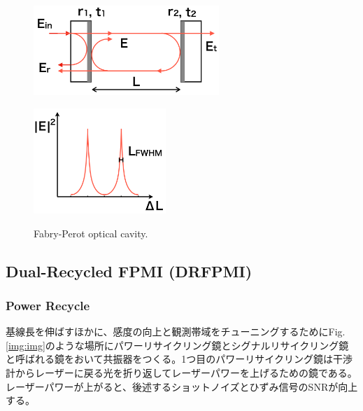 \begin{figure}[h]
  \begin{minipage}[b]{0.5\hsize}
    \begin{center}   
      \includegraphics[width=7cm]{./img_chap1/img133a.png}
       \label{img:img133a}
    \end{center}
  \end{minipage}\hspace{3pt}
  \begin{minipage}[b]{0.5\hsize}
    \begin{center}   
      \includegraphics[width=5cm]{./img_chap1/img133b.png}
       \label{img:img133b}
    \end{center}    
  \end{minipage}
  \caption{Fabry-Perot optical cavity.}
\end{figure}


\subsection{Dual-Recycled FPMI (DRFPMI)}
\subsubsection{Power Recycle}
基線長を伸ばすほかに、感度の向上と観測帯域をチューニングするためにFig.\ref{img:img}のような場所にパワーリサイクリング鏡とシグナルリサイクリング鏡と呼ばれる鏡をおいて共振器をつくる\cite{meers1988recycling}。1つ目のパワーリサイクリング鏡は干渉計からレーザーに戻る光を折り返してレーザーパワーを上げるための鏡である。レーザーパワーが上がると、後述するショットノイズとひずみ信号のSNRが向上する。
